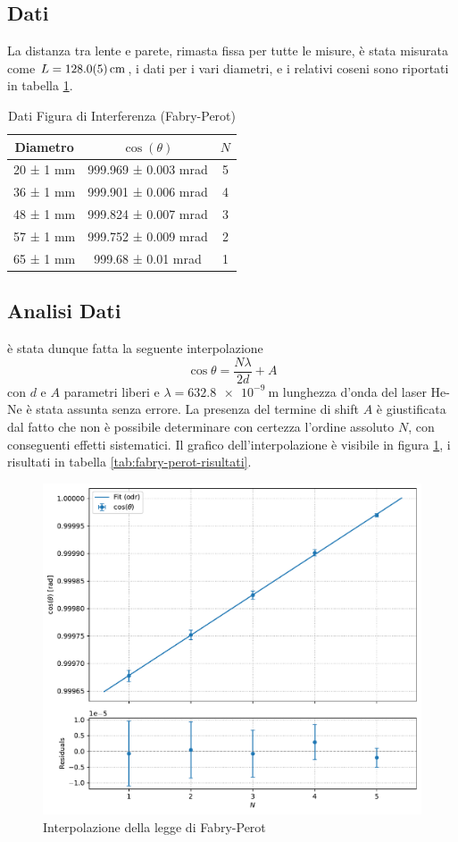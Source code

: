 \documentclass[a4paper]{article}
\begin{document}
\subsection{Dati}
La distanza tra lente e parete, rimasta fissa per tutte le misure, è stata misurata come $L=\SI{128 \pm 0.5}{\centi\meter}$, i dati per i vari diametri, e i relativi coseni sono riportati in tabella \ref{tab:fabry-perot-dati}.
\begin{table}[htbp]
\centering
\caption{Dati Figura di Interferenza (Fabry-Perot)}
\begin{tabular}{|c|c|c|}
\hline
Diametro & $\cos(\theta)$ & $N$ \\\hline\hline
20 ± 1 mm & 999.969 ± 0.003 mrad & 5 \\
36 ± 1 mm & 999.901 ± 0.006 mrad & 4 \\
48 ± 1 mm & 999.824 ± 0.007 mrad & 3 \\
57 ± 1 mm & 999.752 ± 0.009 mrad & 2 \\
65 ± 1 mm & 999.68 ± 0.01 mrad & 1 \\
\hline
\end{tabular}
\label{tab:fabry-perot-dati}
\end{table}
\subsection{Analisi Dati}
è stata dunque fatta la seguente interpolazione
\[\cos \theta = \frac{N\lambda}{2d} + A\]
con $d$ e $A$ parametri liberi e $\lambda=\SI{632.8e-9}{\meter}$ lunghezza d'onda del laser He-Ne è stata assunta senza errore. La presenza del termine di shift $A$ è giustificata dal fatto che non è possibile determinare con certezza l'ordine assoluto $N$, con conseguenti effetti sistematici.
Il grafico dell'interpolazione è visibile in figura \ref{fig:fabry-perot-interpolazione}, i risultati in tabella \ref{tab:fabry-perot-risultati}.

\begin{figure}[htbp]
\centering
\includegraphics[width=1.0\textwidth]{./grafici/fabry_perot_interferenza.pdf}
\caption{Interpolazione della legge di Fabry-Perot}
\label{fig:fabry-perot-interpolazione}
\end{figure}
\end{document}
